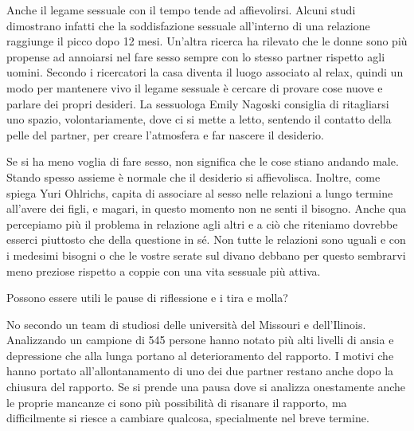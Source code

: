 \documentclass[12pt]{book} %
\begin{document}
Anche il legame sessuale con il tempo tende ad affievolirsi. Alcuni
studi dimostrano infatti che la soddisfazione sessuale all'interno di una relazione raggiunge il picco
dopo 12 mesi. Un'altra
ricerca ha rilevato che le
donne sono più propense ad annoiarsi nel fare sesso sempre con lo stesso partner rispetto agli uomini. Secondo i
ricercatori la casa diventa il luogo associato al relax, quindi un modo per mantenere vivo il legame sessuale è cercare
di provare cose nuove e parlare dei propri
desideri. La sessuologa Emily Nagoski
consiglia di ritagliarsi uno spazio, volontariamente, dove ci si mette a letto, sentendo il contatto della pelle del
partner, per creare l'atmosfera e far nascere il
desiderio.

Se si ha meno voglia di fare sesso, non significa che le cose stiano andando male. Stando spesso assieme è normale che
il desiderio si affievolisca. Inoltre, come spiega Yuri Ohlrichs, capita di associare al sesso nelle relazioni a lungo
termine all'avere dei figli, e magari, in questo momento non ne senti il bisogno. Anche qua
percepiamo più il problema in relazione agli altri e a ciò che riteniamo dovrebbe esserci piuttosto che della questione
in sé. Non tutte le relazioni sono uguali e con i medesimi bisogni o che le vostre serate sul divano debbano per questo
sembrarvi meno preziose rispetto a coppie con una vita sessuale più
attiva.

\begin{mdframed}[linewidth=1pt]
Possono essere utili le pause di riflessione e i tira e molla?

No secondo un team di studiosi delle università del Missouri e dell'Ilinois. Analizzando un campione di 545 persone
hanno notato più alti livelli di ansia e depressione che alla lunga portano al deterioramento del rapporto. I motivi
che hanno portato all'allontanamento di uno dei due partner restano anche dopo la chiusura del
rapporto. Se si prende una pausa dove si analizza onestamente anche le proprie mancanze ci sono più possibilità di
risanare il rapporto, ma difficilmente si riesce a cambiare qualcosa, specialmente nel breve termine. 
\end{mdframed}
\end{document}
